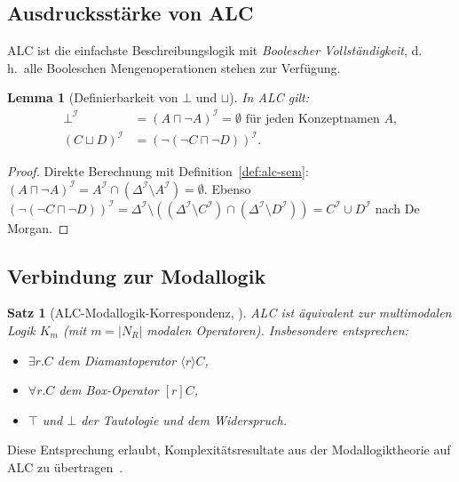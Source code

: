 ﻿\documentclass[a4paper,12pt]{article}
\theoremstyle{definition}
\theoremstyle{plain}
\newtheorem{satz}{Satz}[section]
\newtheorem{lemma}{Lemma}[section]
\theoremstyle{remark}
\newcommand{\interp}[1]{\ensuremath{\mathcal{#1}}}
\newcommand{\Dom}[1]{\ensuremath{\Delta^{\interp{#1}}}}
\begin{document}
\subsection{Ausdrucksst{\"{a}}rke von ALC}

\textsf{ALC} ist die einfachste Beschreibungslogik mit
\emph{Boolescher Vollst{\"{a}}ndigkeit}, d.\,h.\ alle Booleschen
Mengenoperationen stehen zur Verf{\"{u}}gung.

\begin{lemma}[Definierbarkeit von $\bot$ und $\sqcup$]
In \textsf{ALC} gilt:
\begin{align*}
  \bot^\interp{I} &= (A \sqcap \neg A)^\interp{I} = \emptyset
    \text{ f{\"{u}}r jeden Konzeptnamen } A, \\
  (C \sqcup D)^\interp{I}
    &= (\neg(\neg C \sqcap \neg D))^\interp{I}.
\end{align*}
\end{lemma}

\begin{proof}
Direkte Berechnung mit Definition~\ref{def:alc-sem}:
$(A \sqcap \neg A)^\interp{I} = A^\interp{I} \cap (\Dom{I} \setminus A^\interp{I}) = \emptyset$.
Ebenso $(\neg(\neg C \sqcap \neg D))^\interp{I} = \Dom{I} \setminus ((\Dom{I} \setminus C^\interp{I}) \cap (\Dom{I} \setminus D^\interp{I})) = C^\interp{I} \cup D^\interp{I}$ nach De Morgan.
\end{proof}

\subsection{Verbindung zur Modallogik}

\begin{satz}[ALC-Modallogik-Korrespondenz, \cite{Schmidt1991}]
\label{satz:alc-modal}
\textsf{ALC} ist {\"{a}}quivalent zur multimodalen Logik
$K_m$ (mit $m = |N_R|$ modalen Operatoren).
Insbesondere entsprechen:
\begin{itemize}
  \item $\exists r.C$ dem Diamantoperator $\langle r \rangle C$,
  \item $\forall r.C$ dem Box-Operator $[r] C$,
  \item $\top$ und $\bot$ der Tautologie und dem Widerspruch.
\end{itemize}
\end{satz}

Diese Entsprechung erlaubt, Komplexit{\"{a}}tsresultate aus der
Modallogiktheorie auf \textsf{ALC} zu {\"{u}}bertragen~\cite{Blackburn2001}.
\end{document}
